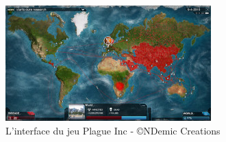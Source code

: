 \begin{itemize}
\end{itemize}
\begin{figure}
\begin{center}
\includegraphics{images/plagueIncMap.jpg}
\end{center}
\caption{L'interface du jeu Plague Inc - \copyright NDemic Creations }
\label{plagueIncMap}
\end{figure}
